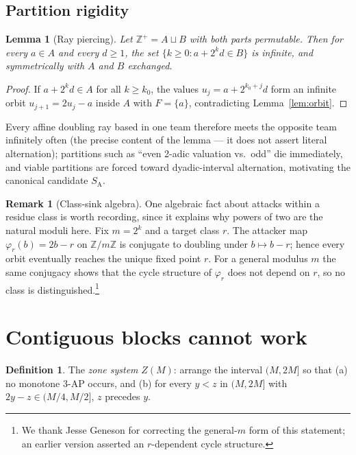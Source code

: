\documentclass[11pt]{article}
\newtheorem{lemma}[theorem]{Lemma}
\theoremstyle{definition}
\newtheorem{definition}[theorem]{Definition}
\newtheorem{remark}[theorem]{Remark}
\newcommand{\Z}{\mathbb{Z}}
\newcommand{\SA}{S_{\mathrm{A}}}
\begin{document}
\subsection{Partition rigidity}

\begin{lemma}[Ray piercing]\label{lem:ray}
Let $\Z^+ = A \sqcup B$ with both parts permutable. Then for every $a \in A$ and
every $d \ge 1$, the set $\{k \ge 0 : a + 2^k d \in B\}$ is infinite, and
symmetrically with $A$ and $B$ exchanged.
\end{lemma}

\begin{proof}
If $a + 2^k d \in A$ for all $k \ge k_0$, the values $u_j = a + 2^{k_0+j} d$
form an infinite orbit $u_{j+1} = 2u_j - a$ inside $A$ with $F = \{a\}$,
contradicting Lemma~\ref{lem:orbit}.
\end{proof}

Every affine doubling ray based in one team therefore meets the opposite
team infinitely often (the precise content of the lemma --- it does not
assert literal alternation); partitions
such as ``even 2-adic valuation vs.\ odd'' die immediately, and viable partitions
are forced toward dyadic-interval alternation, motivating the canonical
candidate $\SA$.

\begin{remark}[Class-sink algebra]\label{rem:classsink}
One algebraic fact about attacks within a residue class is worth recording,
since it explains why powers of two are the natural moduli here. Fix
$m = 2^k$ and a target class $r$. The attacker map $\varphi_r(b) = 2b - r$
on $\Z/m\Z$ is conjugate to doubling under $b \mapsto b - r$; hence every
orbit eventually reaches the unique fixed point $r$. For a general modulus
$m$ the same conjugacy shows that the cycle structure of $\varphi_r$ does
not depend on $r$, so no class is distinguished.\footnote{We thank
Jesse Geneson for correcting the general-$m$ form of this statement; an
earlier version asserted an $r$-dependent cycle structure.}
\end{remark}

\section{Contiguous blocks cannot work}\label{sec:contig}

\begin{definition}
The \emph{zone system} $Z(M)$: arrange the interval $(M, 2M]$ so that (a) no
monotone 3-AP occurs, and (b) for every $y < z$ in $(M,2M]$ with
$2y - z \in (M/4, M/2]$, $z$ precedes $y$.
\end{definition}
\end{document}
